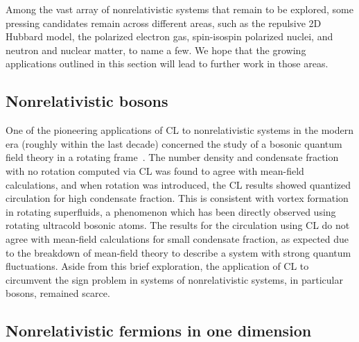 \documentclass[../main.tex]{subfiles}
\begin{document}
Among the vast array of nonrelativistic systems that remain to be explored, some pressing candidates remain across different areas,
such as the repulsive 2D Hubbard model, the polarized electron gas, spin-isospin polarized nuclei, and neutron and nuclear matter, to name a few.
We hope that the growing applications outlined in this section will lead to further work in those areas.

\subsection{Nonrelativistic bosons}

One of the pioneering applications of CL to nonrelativistic systems in the modern era (roughly within the last decade) concerned the study of a bosonic quantum
field theory in a rotating frame~\cite{PhysRevA92043628}.
The number density and condensate fraction with no rotation computed via CL was found to agree with mean-field calculations, and when rotation
was introduced, the CL results showed quantized circulation for high condensate fraction. This is consistent with vortex formation in rotating
superfluids, a phenomenon which has been directly observed using rotating ultracold bosonic atoms. The results for the circulation
using CL do not agree with mean-field calculations for small condensate fraction, as expected due to the breakdown of mean-field
theory to describe a system with strong quantum fluctuations. Aside from this brief exploration, the application of CL to
circumvent the sign problem in systems of nonrelativistic systems, in particular bosons, remained scarce.

\subsection{Nonrelativistic fermions in one dimension}
\end{document}
